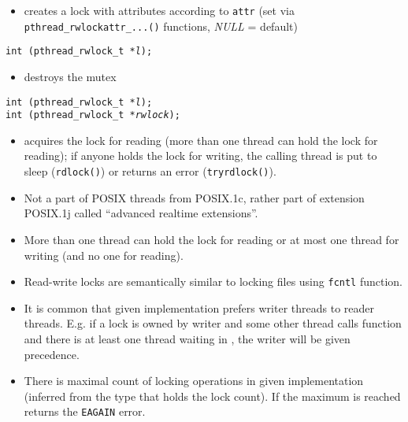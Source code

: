 \begin{slide}
\prgchars
{}
\begin{itemize}
\item creates a lock with attributes according to \texttt{attr}
(set via \texttt{pthread\_rwlockattr\_...()} functions, \emph{NULL} = default)
\end{itemize}
\texttt{int (pthread\_rwlock\_t *\emph{l});}
\begin{itemize}
\item destroys the mutex
\end{itemize}
\texttt{int (pthread\_rwlock\_t *\emph{l});}\\
\texttt{int (pthread\_rwlock\_t *\emph{rwlock});}
\begin{itemize}
\item acquires the lock for reading (more than one thread can hold the lock
for reading); if anyone holds the lock for writing, the calling thread is put
to sleep (\texttt{rdlock()}) or returns an error (\texttt{tryrdlock()}).
\end{itemize}
\end{slide}

\label{RWLOCKS}

\begin{itemize}
\item Not a part of POSIX threads from POSIX.1c, rather part of extension
POSIX.1j called ``advanced realtime extensions''.
\item More than one thread can hold the lock for reading or at most one
thread for writing (and no one for reading).
\item Read-write locks are semantically similar to locking files using
\texttt{fcntl} function.
\item It is common that given implementation prefers writer threads to
reader threads. E.g. if a lock is owned by writer and some other thread
calls function  and there is at least one thread
waiting in , the writer will be given precedence.
\item There is maximal count of locking operations in given implementation
(inferred from the type that holds the lock count). If the maximum is reached
 returns the \texttt{EAGAIN} error.
\end{itemize}

